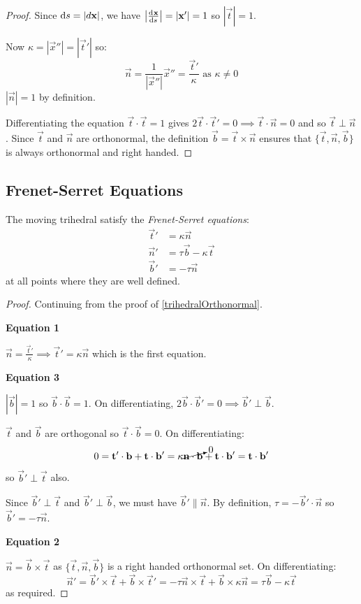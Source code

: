 \documentclass[../main.tex]{subfiles}
\begin{document}
\begin{proof}
  Since $\d{s} = |d\vec{x}|$, we have $\abs{\deriv{\vec{x}}{s}} = |\vec{x}'| = 1$ so $|\vec{t}| = 1$.

  Now $\kappa = |\vec{x}''| = |\vec{t}'|$ so:
  \[
    \vec{n} = \frac{1}{|\vec{x}''|} \vec{x}'' = \frac{\vec{t}'}{\kappa} \text{ as $\kappa \neq 0$}
  \]
  $|\vec{n}| = 1$ by definition.

  Differentiating the equation $\vec{t} \cdot \vec{t} = 1$ gives $2\vec{t} \cdot \vec{t}' = 0 \implies \vec{t} \cdot \vec{n} = 0$ and so $\vec{t} \perp \vec{n}$.
  Since $\vec{t}$ and $\vec{n}$ are orthonormal, the definition $\vec{b} = \vec{t} \times \vec{n}$ ensures that $\{\vec{t}, \vec{n}, \vec{b}\}$  is always orthonormal and right handed.
\end{proof}
\subsection{Frenet-Serret Equations}
\begin{theorem}
  The moving trihedral satisfy the \textit{Frenet-Serret equations}:
  \begin{align*}
    \vec{t}' &= \kappa \vec{n} \\
    \vec{n}' &= \tau \vec{b} - \kappa \vec{t} \\
    \vec{b}' &= - \tau \vec{n}
  \end{align*}
  at all points where they are well defined.
\end{theorem}
\begin{proof}
  Continuing from the proof of \cref{trihedralOrthonormal}.

  \textbf{Equation 1}\par
  $\vec{n} = \frac{\vec{t}'}{\kappa} \implies \vec{t}' = \kappa \vec{n}$ which is the first equation.

  \textbf{Equation 3}\par
  $|\vec{b}| = 1$ so $\vec{b} \cdot \vec{b} = 1$.
  On differentiating, $2\vec{b} \cdot \vec{b}' = 0 \implies \vec{b}' \perp \vec{b}$.

  $\vec{t}$ and $\vec{b}$ are orthogonal so $\vec{t} \cdot \vec{b} = 0$.
  On differentiating:
  \[
    0 = \vec{t}' \cdot \vec{b} + \vec{t} \cdot \vec{b}' = \kappa \cancelto{0}{\vec{n} \cdot \vec{b}} + \vec{t} \cdot \vec{b}' = \vec{t} \cdot \vec{b}'
  \]
  so $\vec{b}' \perp \vec{t}$ also.

  Since $\vec{b}' \perp \vec{t}$ and $\vec{b}' \perp \vec{b}$, we must have $\vec{b}' \parallel \vec{n}$.
  By definition, $\tau = -\vec{b}' \cdot \vec{n}$ so $\vec{b}' = -\tau \vec{n}$.

  \textbf{Equation 2}\par
  $\vec{n} = \vec{b} \times \vec{t}$ as $\{\vec{t}, \vec{n}, \vec{b}\}$ is a right handed orthonormal set.
  On differentiating:
  \[
    \vec{n}' = \vec{b}' \times \vec{t} + \vec{b} \times \vec{t}' = -\tau \vec{n} \times \vec{t} + \vec{b} \times \kappa \vec{n} = \tau \vec{b} - \kappa \vec{t}
  \]
  as required.
\end{proof}
\end{document}

